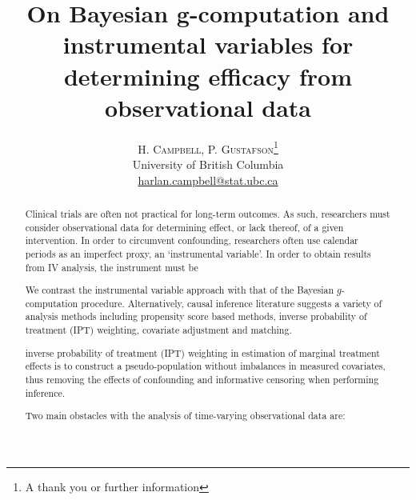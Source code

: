 \documentclass[twoside]{article}
\title{\vspace{-15mm}\fontsize{24pt}{10pt}\selectfont\textbf{On Bayesian g-computation and instrumental variables for determining efficacy  from observational data}} %
\author{
\large
\textsc{H. Campbell, P. Gustafson}\thanks{A thank you or further information}\\[2mm] %
\normalsize University of British Columbia \\ %
\normalsize \href{mailto:harlan.campbell@stat.ubc.ca}{harlan.campbell@stat.ubc.ca} %
\vspace{-5mm}
}
\date{}
\begin{document}
\maketitle %

\thispagestyle{fancy} %


\begin{abstract}

\noindent Clinical trials are often not practical for long-term outcomes.  As such, researchers must consider observational data for determining effect, or lack thereof, of a given intervention.  In order to circumvent confounding, researchers often use calendar periods as an imperfect proxy, an `instrumental variable'.  In order to obtain results from IV analysis, the instrument must be 


We contrast the instrumental variable approach with that of the Bayesian $g$-computation procedure.  Alternatively, causal inference literature suggests a variety of analysis methods including propensity score based methods, inverse probability of treatment (IPT) weighting, covariate adjustment and matching.

inverse probability of treatment (IPT) weighting in estimation of marginal treatment effects is to construct a pseudo-population without imbalances in measured covariates, thus removing the effects of confounding and informative censoring when performing inference. 

Two main obstacles with the analysis of time-varying observational data are:


\end{abstract}

\end{document}
